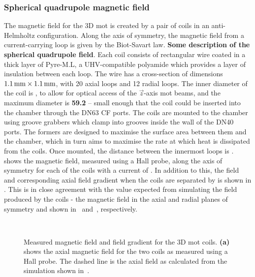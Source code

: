 \subsubsection{Spherical quadrupole magnetic field}
The magnetic field for the 3D \ac{mot} is created by a pair of coils in an
anti-Helmholtz configuration. Along the axis of symmetry, the magnetic field
from a current-carrying loop is given by the Biot-Savart law. {\textbf{Some
	description of the spherical quadrupole field}}. Each coil consists of
rectangular wire coated in a  thick layer of Pyre-M.L,
a UHV-compatible polyamide which provides a layer of insulation between each
loop. The wire has a cross-section of dimensions \(\sivalue{1.1}{\milli\metre}
\times \sivalue{1.1}{\milli\metre}\), with 20 axial loops and 12 radial loops.
The inner diameter of the coil is , to allow for
optical access of the \(\vec{z}\)-axis \ac{mot} beams, and the maximum diameter
is \textbf{59.2}\sivalue{}{\milli\metre} -- small enough that the coil could be
inserted into the chamber through the DN63 CF ports. The coils are mounted to
the chamber using groove grabbers which clamp into grooves inside the wall of
the DN40 ports. The formers are designed to maximise the surface area between
them and the chamber, which in turn aims to maximise the rate at which heat is
dissipated from the coils. Once mounted, the distance between the innermost
loops is .  shows the
magnetic field, measured using a Hall probe, along the axis of symmetry for each
of the coils with a current of . In addition to this, the
field and corresponding axial field gradient when the coils are separated by
 is shown in . This
is in close agreement with the value expected from simulating the field produced
by the coils - the magnetic field in the axial and radial planes of symmetry and
shown in~ and~,
respectively.
\begin{figure}
	\centering
	\def\svgwidth{\columnwidth}
	\\
	\caption[Measured magnetic field and field gradient for the 3D \ac{mot}
		coils]{Measured magnetic field and field gradient for the 3D \ac{mot}
		coils. \textbf{(a)} shows the axial magnetic field for the two coils as
		measured using a Hall probe. The dashed line is the axial field as
		calculated from the simulation shown
		in~.}
	\label{fig:3D_mot_field_measured}
\end{figure}
